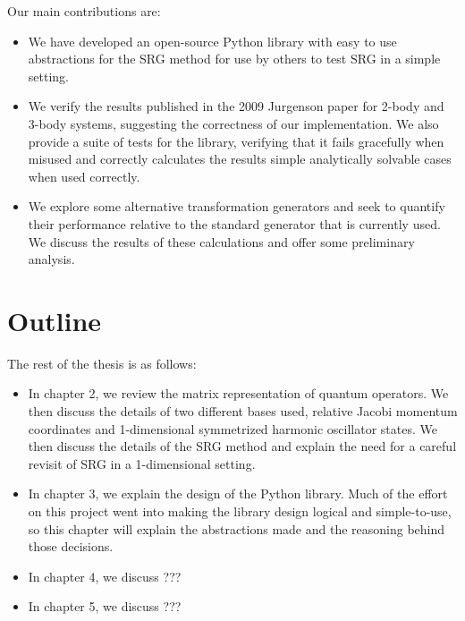Our main contributions are:
\begin{itemize}
    \item{We have developed an open-source Python library with easy to use abstractions for the SRG method for use by others to test SRG in a simple setting.}
    \item{We verify the results published in the 2009 Jurgenson paper for 2-body and 3-body systems, suggesting the correctness of our implementation. We also provide a suite of tests for the library, verifying that it fails gracefully when misused and correctly calculates the results simple analytically solvable cases when used correctly.}
    \item{We explore some alternative transformation generators and seek to quantify their performance relative to the standard generator that is currently used. We discuss the results of these calculations and offer some preliminary analysis.}
\end{itemize}

\section{Outline}

The rest of the thesis is as follows:
\begin{itemize}
    \item{In chapter 2, we review the matrix representation of quantum operators. We then discuss the details of two different bases used, relative Jacobi momentum coordinates and 1-dimensional symmetrized harmonic oscillator states. We then discuss the details of the SRG method and explain the need for a careful revisit of SRG in a 1-dimensional setting.}
    \item{In chapter 3, we explain the design of the Python library. Much of the effort on this project went into making the library design logical and simple-to-use, so this chapter will explain the abstractions made and the reasoning behind those decisions.}
    \item{In chapter 4, we discuss ???}
    \item{In chapter 5, we discuss ???}
\end{itemize}

